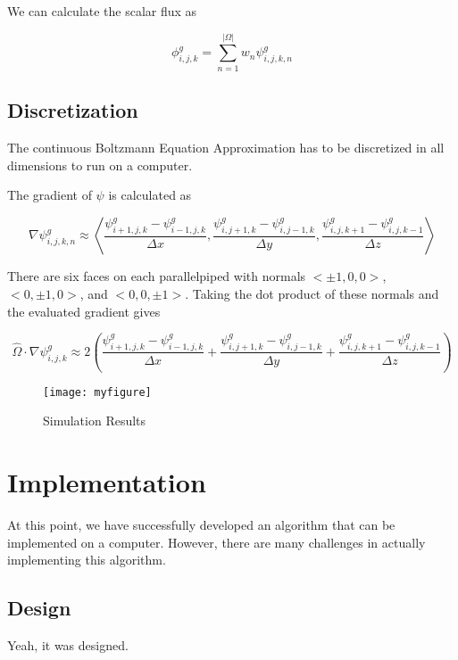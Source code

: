 \documentclass{article}
\numberwithin{equation}{subsection}
\begin{document}
We can calculate the scalar flux as

\begin{equation}
\phi_{i,j,k}^g = \sum_{n=1}^{|\Omega|} w_n \psi_{i,j,k,n}^g
\end{equation}

\subsection{Discretization}
The continuous Boltzmann Equation Approximation has to be discretized in all dimensions to run on a computer.

The gradient of $\psi$ is calculated as

\begin{equation}
\nabla \psi_{i,j,k,n}^g \approx
\left\langle  
\frac{\psi_{i+1,j,k}^g - \psi_{i-1,j,k}^g}{\Delta x},
\frac{\psi_{i,j+1,k}^g - \psi_{i,j-1,k}^g}{\Delta y},
\frac{\psi_{i,j,k+1}^g - \psi_{i,j,k-1}^g}{\Delta z}
\right\rangle
\end{equation}

There are six faces on each parallelpiped with normals $<\pm 1, 0, 0>$, $<0, \pm 1, 0>$, and $<0, 0, \pm 1>$. Taking the dot product of these normals and the evaluated gradient gives

\begin{equation}
\hat{\Omega} \cdot \nabla \psi_{i,j,k}^g \approx
2 \left(
\frac{\psi_{i+1,j,k}^g - \psi_{i-1,j,k}^g}{\Delta x} +
\frac{\psi_{i,j+1,k}^g - \psi_{i,j-1,k}^g}{\Delta y} +
\frac{\psi_{i,j,k+1}^g - \psi_{i,j,k-1}^g}{\Delta z}
\right)
\end{equation}

\begin{figure}
    \centering
    \texttt{[image: myfigure]}
    \caption{Simulation Results}
    \label{simulationfigure}
\end{figure}

\section{Implementation}
At this point, we have successfully developed an algorithm that can be implemented on a computer. However, there are many challenges in actually implementing this algorithm.

\subsection{Design}
Yeah, it was designed.
\end{document}
